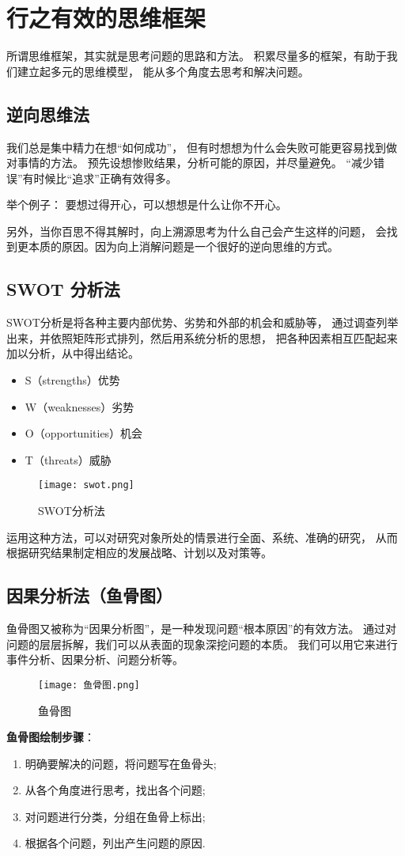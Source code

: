 \documentclass[../main.tex]{subfiles}
\begin{document}
\section{行之有效的思维框架}
所谓思维框架，其实就是思考问题的思路和方法。
积累尽量多的框架，有助于我们建立起多元的思维模型，
能从多个角度去思考和解决问题。
%
\subsection{逆向思维法}
我们总是集中精力在想``如何成功''，
但有时想想为什么会失败可能更容易找到做对事情的方法。
预先设想惨败结果，分析可能的原因，并尽量避免。
``减少错误''有时候比``追求''正确有效得多。

举个例子： 要想过得开心，可以想想是什么让你不开心。

另外，当你百思不得其解时，向上溯源思考为什么自己会产生这样的问题，
会找到更本质的原因。因为向上消解问题是一个很好的逆向思维的方式。
%
\subsection{SWOT 分析法}
SWOT分析是将各种主要内部优势、劣势和外部的机会和威胁等，
通过调查列举出来，并依照矩阵形式排列，然后用系统分析的思想，
把各种因素相互匹配起来加以分析，从中得出结论。
%
\begin{itemize}
  \item S（strengths）优势
  \item W（weaknesses）劣势
  \item O（opportunities）机会
  \item T（threats）威胁
\end{itemize}
%
\begin{figure}[H]
  \begin{center}
    \texttt{[image: swot.png]}
  \end{center}
  \caption{SWOT分析法}
\end{figure}
%
运用这种方法，可以对研究对象所处的情景进行全面、系统、准确的研究，
从而根据研究结果制定相应的发展战略、计划以及对策等。
%
\subsection{因果分析法（鱼骨图）}
鱼骨图又被称为``因果分析图''，是一种发现问题``根本原因''的有效方法。
通过对问题的层层拆解，我们可以从表面的现象深挖问题的本质。
我们可以用它来进行事件分析、因果分析、问题分析等。
%
\begin{figure}[H]
  \begin{center}
    \texttt{[image: 鱼骨图.png]}
  \end{center}
  \caption{鱼骨图}
\end{figure}
%
\textbf{鱼骨图绘制步骤}：
\begin{enumerate}
  \item 明确要解决的问题，将问题写在鱼骨头;
  \item 从各个角度进行思考，找出各个问题;
  \item 对问题进行分类，分组在鱼骨上标出;
  \item 根据各个问题，列出产生问题的原因.
\end{enumerate}
%
\end{document}
